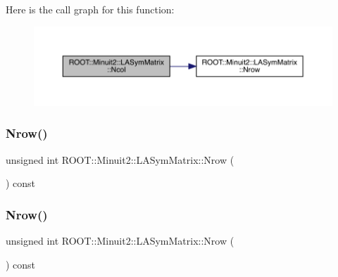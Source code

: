 Here is the call graph for this function\+:
\nopagebreak
\begin{figure}[H]
\begin{center}
\leavevmode
\includegraphics[width=350pt]{d3/d72/classROOT_1_1Minuit2_1_1LASymMatrix_a36bb0f349110a80cb742953ae68fc9c5_cgraph}
\end{center}
\end{figure}
\mbox{\label{classROOT_1_1Minuit2_1_1LASymMatrix_ac76b44933bc4b144b8671c089b8d7ef5}} 
\subsubsection{\texorpdfstring{Nrow()}{Nrow()}\hspace{0.1cm}{\footnotesize\ttfamily [1/3]}}
{\footnotesize\ttfamily unsigned int R\+O\+O\+T\+::\+Minuit2\+::\+L\+A\+Sym\+Matrix\+::\+Nrow (\begin{DoxyParamCaption}{ }\end{DoxyParamCaption}) const\hspace{0.3cm}{\ttfamily [inline]}}

\mbox{\label{classROOT_1_1Minuit2_1_1LASymMatrix_ac76b44933bc4b144b8671c089b8d7ef5}} 
\subsubsection{\texorpdfstring{Nrow()}{Nrow()}\hspace{0.1cm}{\footnotesize\ttfamily [2/3]}}
{\footnotesize\ttfamily unsigned int R\+O\+O\+T\+::\+Minuit2\+::\+L\+A\+Sym\+Matrix\+::\+Nrow (\begin{DoxyParamCaption}{ }\end{DoxyParamCaption}) const\hspace{0.3cm}{\ttfamily [inline]}}

